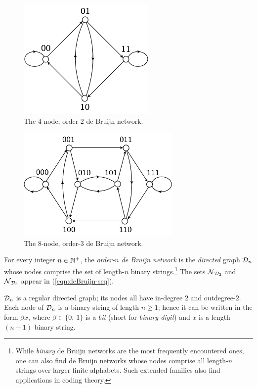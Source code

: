 \begin{figure}[hbt]
\begin{center}
       \includegraphics[scale=0.5]{FiguresGraph/dB2by2}
       \caption{The $4$-node, order-$2$ de Bruijn network.}
  \label{fig:dB2by2}
\end{center}
\end{figure}

\begin{figure}[hbt]
\begin{center}
       \includegraphics[scale=0.6]{FiguresGraph/dB2by3}
       \caption{The $8$-node, order-$3$ de Bruijn network.}
  \label{fig:dB2by3}
\end{center}
\end{figure}

For every integer $n \in \mathbb{N}^+$, the {\it order-$n$ de Bruijn network}
is the {\em directed} graph $\mbox{$\cal D$}_n$ whose nodes comprise the set of
length-$n$ binary strings.\footnote{While {\em binary} de Bruijn
  networks are the most frequently encountered ones, one can also find
  de Bruijn networks whose nodes comprise all length-$n$ strings over
  larger finite alphabets.  Such extended families also find
  applications in coding theory.}  The sets $\mbox{$\cal N$}_{\mbox{{\scriptsize $\cal D$}}_2}$ and
$\mbox{$\cal N$}_{\mbox{{\scriptsize $\cal D$}}_3}$ appear in (\ref{eqn:deBruijn-seq}).


$\mbox{$\cal D$}_n$ is a regular directed graph; its nodes all have in-degree $2$
and outdegree-$2$.  Each node of $\mbox{$\cal D$}_n$ is a binary string of
length $n \geq 1$; hence it can be written in the form $\beta x$,
where $\beta \in \{0, \ 1\}$ is a {\it bit} (short for {\it binary
  digit}) and $x$ is a length-$(n-1)$ binary string.

